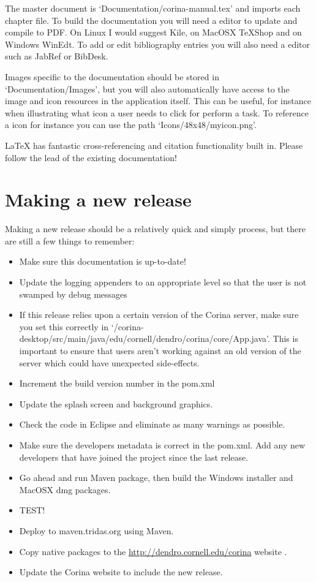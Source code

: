 The master document is `Documentation/corina-manual.tex' and imports each chapter file.  To build the documentation you will need a editor to update and compile to PDF.  On Linux I would suggest Kile, on MacOSX TeXShop and on Windows WinEdt.  To add or edit bibliography entries you will also need a {\BibTeX} editor such as JabRef or BibDesk.

Images specific to the documentation should be stored in `Documentation/Images', but you will also automatically have access to the image and icon resources in the application itself.  This can be useful, for instance when illustrating what icon a user needs to click for perform a task.  To reference a icon for instance you can use the path `Icons/48x48/myicon.png'.

{\LaTeX} has fantastic cross-referencing and citation functionality built in.  Please follow the lead of the existing documentation!


\section{Making a new release}
Making a new release should be a relatively quick and simply process, but there are still a few things to remember:

\begin{itemize}
 \item Make sure this documentation is up-to-date!  
 \item Update the logging appenders to an appropriate level so that the user is not swamped by debug messages
 \item If this release relies upon a certain version of the Corina server, make sure you set this correctly in `/corina-desktop/src/main/java/edu/cornell/dendro/corina/core/App.java'.  This is important to ensure that users aren't working against an old version of the server which could have unexpected side-effects.
 \item Increment the build version number in the pom.xml
 \item Update the splash screen and background graphics.
 \item Check the code in Eclipse and eliminate as many warnings as possible.
 \item Make sure the developers metadata is correct in the pom.xml.  Add any new developers that have joined the project since the last release.
 \item Go ahead and run Maven package, then build the Windows installer and MacOSX dmg packages.
 \item TEST!
 \item Deploy to maven.tridas.org using Maven.
 \item Copy native packages to the \url{http://dendro.cornell.edu/corina} website .
 \item Update the Corina website to include the new release.
\end{itemize}


